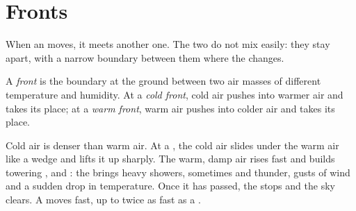 \section{Fronts}

When an  moves, it meets another one. The two do not mix
easily: they stay apart, with a narrow boundary between them where the
 changes.

\begin{definition}[Front]\label{def:g8:fronts-and-weather-maps:front}
A \emph{front} is the boundary at the ground between two air
masses of different temperature and humidity. At a \emph{cold
front}, cold air pushes into warmer air and takes its
place; at a \emph{warm front}, warm air pushes into
colder air and takes its place.
\end{definition}

Cold air is denser than warm air. At a , the cold air slides
under the warm air like a wedge and lifts it up sharply. The warm, damp air
rises fast and builds towering ,  and : the 
brings heavy showers, sometimes  and thunder, gusts of wind and a
sudden drop in temperature. Once it has passed, the  stops and the sky
clears. A  moves fast, up to twice as fast as a .

